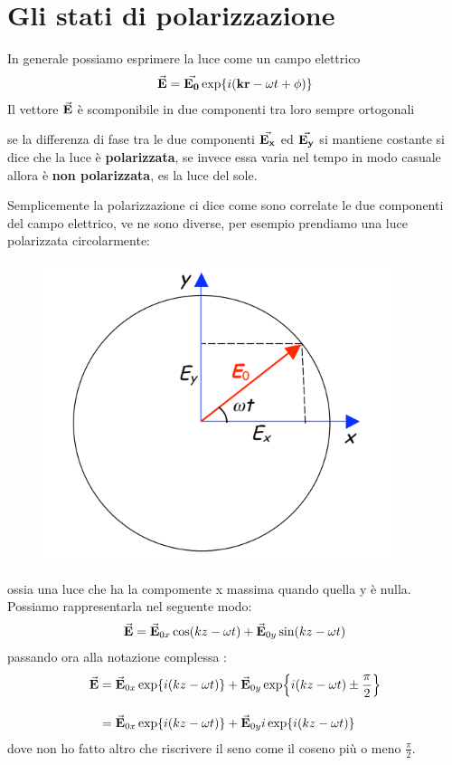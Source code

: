 \chapter{Gli stati di polarizzazione}
In generale possiamo esprimere la luce come un campo elettrico 
\begin{align*}
    \va{E} = \va{E_{0}}\exp{i(\vb{k}\vb{r}-\omega t + \phi)}
\end{align*}
Il vettore $\va{E}$ è scomponibile in due componenti tra loro sempre ortogonali
\begin{tcolorbox}[colback=red!5!white,colframe=red!50!black,title=ATTENZIONE !]
        se la differenza di fase tra le due componenti $\va{E_{x}}$ ed $\va{E_{y}}$ si mantiene 
        costante si dice che la luce è \textbf{polarizzata}, se invece essa varia nel tempo 
        in modo casuale allora è \textbf{non polarizzata}, es la luce del sole.
\end{tcolorbox}
Semplicemente la polarizzazione ci dice come sono correlate le due componenti del campo elettrico, 
ve ne sono diverse, per esempio prendiamo una luce polarizzata circolarmente:
\begin{figure}[!h]
    \centering
    \includegraphics[scale=0.5]{polarizzazione/PolarizzazioneCirc} 
\end{figure}

ossia una luce che ha la compomente x massima quando quella y è nulla. 
\newpage
Possiamo rappresentarla nel seguente modo:
\begin{align*}
    \va{E} = \va{E}_{0x}\cos(kz-\omega t) + \va{E}_{0y}\sin(kz-\omega t)
\end{align*}
passando ora alla notazione complessa :
\begin{align*}
        \va{E} &= \va{E}_{0x}\exp{i(kz-\omega t)} + \va{E}_{0y}\exp{i(kz-\omega t)\pm \frac{\pi}{2}}\\[1em]
               &= \va{E}_{0x}\exp{i(kz-\omega t)} + \va{E}_{0y}i\exp{i(kz-\omega t)}
\end{align*}
dove non ho fatto altro che riscrivere il seno come il coseno più o meno $\frac{\pi}{2}$. \\
